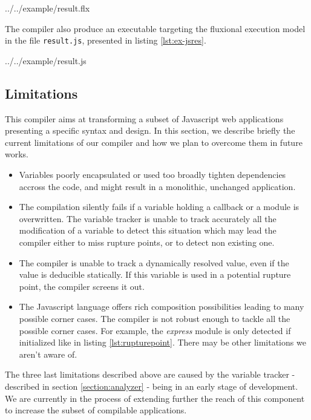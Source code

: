 {../../example/result.flx}

The compiler also produce an executable targeting the fluxional execution model in the file \texttt{result.js}, presented in listing \ref{lst:ex-jsres}.

{../../example/result.js}

\subsection{Limitations}

This compiler aims at transforming a subset of Javascript web applications presenting a specific syntax and design.
In this section, we describe briefly the current limitations of our compiler and how we plan to overcome them in future works.

\begin{itemize}
  \item Variables poorly encapsulated or used too broadly tighten dependencies accross the code, and might result in a monolithic, unchanged application.
  \item The compilation silently fails if a variable holding a callback or a module is overwritten.
        The variable tracker is unable to track accurately all the modification of a variable to detect this situation which may lead the compiler either to miss rupture points, or to detect non existing one.
  \item The compiler is unable to track a dynamically resolved value, even if the value is deducible statically.
        If this variable is used in a potential rupture point, the compiler screens it out.
  \item The Javascript language offers rich composition possibilities leading to many possible corner cases.
        The compiler is not robust enough to tackle all the possible corner cases.
        For example, the \textit{express} module is only detected if initialized like in listing \ref{lst:rupturepoint}.
        There may be other limitations we aren't aware of.
\end{itemize}

The three last limitations described above are caused by the variable tracker - described in section \ref{section:analyzer} - being in an early stage of development.
We are currently in the process of extending further the reach of this component to increase the subset of compilable applications.

